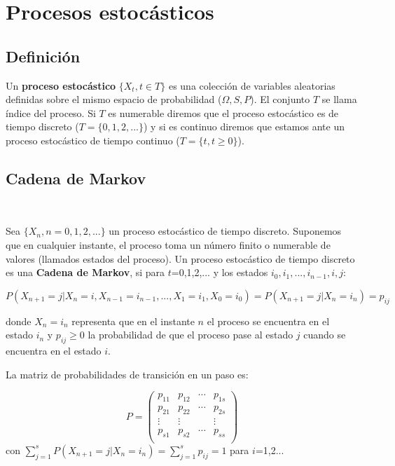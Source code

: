 




\section{
	Procesos estocásticos
}

\subsection{Definición} Un \textbf{proceso estocástico }$\lbrace X_t, t \in T \rbrace$ es una colección de variables aleatorias definidas sobre el mismo espacio de probabilidad ($\Omega,S,P$). El conjunto $T$ se llama índice del proceso. Si $T$ es numerable diremos que el proceso estocástico es de tiempo discreto ($T=\lbrace 0,1,2,... \rbrace$) y si es continuo diremos que estamos ante un proceso estocástico de tiempo continuo ($T=\lbrace t, t\geq 0 \rbrace$).

\subsection{Cadena de Markov}\


Sea $\lbrace X_n, n=0,1,2,...\rbrace$ un proceso estocástico de tiempo discreto. Suponemos que en cualquier instante, el proceso toma un número finito o numerable de valores (llamados estados del proceso).
Un proceso estocástico de tiempo discreto es una \textbf{Cadena de Markov}, si para $t$=0,1,2,... y los estados $i_0, i_1,...,i_{n-1},i,j$:

$$
P(X_{n+1}=j|X_n=i, X_{n-1}=i_{n-1},...,X_1=i_1, X_0=i_0)=P(X_{n+1}=j|X_n=i_n)=p_{ij}
$$

donde $X_n=i_n$ representa que en el instante $n$ el proceso se encuentra en el estado $i_n$ y $p_{ij}\geq 0$ la probabilidad de que el proceso pase al estado $j$ cuando se encuentra en el estado $i$.

La matriz de probabilidades de transición en un paso es:


$$P=
\left(
\begin{array}{cccc}
p_{11} & p_{12} & \cdots & p_{1s} \\
p_{21} & p_{22} & \cdots & p_{2s} \\
\vdots & \vdots & & \vdots \\
p_{s1} & p_{s2} & \cdots & p_{ss} \\
\end{array}
\right)
$$
con $ \sum_{j=1}^{s} P(X_{n+1}=j|X_n=i_n)=\sum_{j=1}^{s} p_{ij}=1 $ para $i$=1,2...\\

